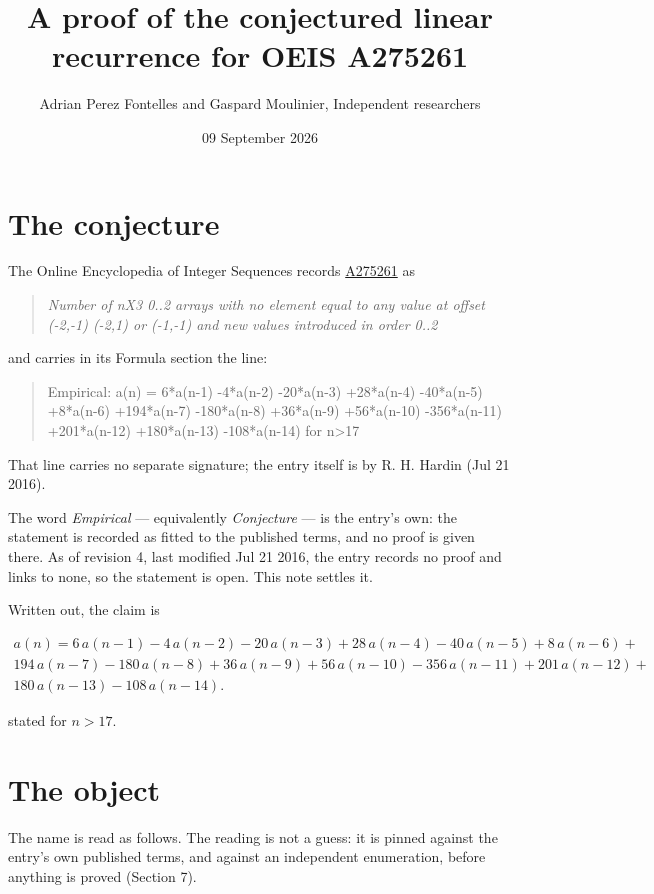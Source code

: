 \documentclass[11pt]{article}
\title{A proof of the conjectured linear recurrence for OEIS A275261}
\author{Adrian Perez Fontelles and Gaspard Moulinier, Independent researchers}
\date{09 September 2026}
\theoremstyle{definition}
\begin{document}
\maketitle
\section{The conjecture}

The Online Encyclopedia of Integer Sequences records \href{https://oeis.org/A275261}{A275261} as

\begin{quote}\itshape Number of nX3 0..2 arrays with no element equal to any value at offset (-2,-1) (-2,1) or (-1,-1) and new values introduced in order 0..2\end{quote}

and carries in its Formula section the line:

\begin{quote}\ttfamily Empirical: a(n) = 6*a(n-1) -4*a(n-2) -20*a(n-3) +28*a(n-4) -40*a(n-5) +8*a(n-6) +194*a(n-7) -180*a(n-8) +36*a(n-9) +56*a(n-10) -356*a(n-11) +201*a(n-12) +180*a(n-13) -108*a(n-14) for n>17\end{quote}

That line carries no separate signature; the entry itself is by R. H. Hardin (Jul 21 2016).

The word {\itshape Empirical} --- equivalently {\itshape Conjecture} --- is the entry's own: the statement is recorded as fitted to the published terms, and no proof is given there. As of revision 4, last modified Jul 21 2016, the entry records no proof and links to none, so the statement is open. This note settles it.

Written out, the claim is

\begin{multline*} a(n) = 6\,a(n-1) - 4\,a(n-2) - 20\,a(n-3) + 28\,a(n-4) - 40\,a(n-5) + 8\,a(n-6) + \\ 194\,a(n-7) - 180\,a(n-8) + 36\,a(n-9) + 56\,a(n-10) - 356\,a(n-11) + 201\,a(n-12) + \\ 180\,a(n-13) - 108\,a(n-14). \end{multline*}

stated for $n > 17$.

\section{The object}

The name is read as follows. The reading is not a guess: it is pinned against the entry's own published terms, and against an independent enumeration, before anything is proved (Section 7).
\end{document}
